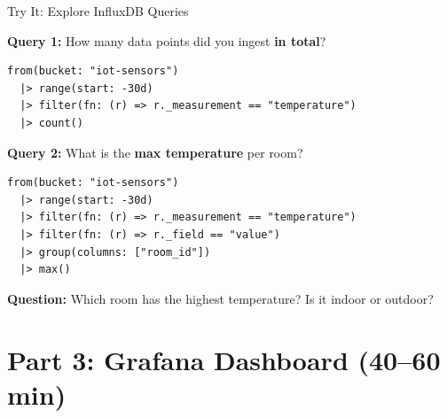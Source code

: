 \documentclass[aspectratio=169,11pt]{beamer}
\begin{document}
\begin{frame}[fragile]{ Try It: Explore InfluxDB Queries}

    \vspace{0.15cm}
    \textbf{Query 1:} How many data points did you ingest \textbf{in total}?
\begin{lstlisting}
from(bucket: "iot-sensors")
  |> range(start: -30d)
  |> filter(fn: (r) => r._measurement == "temperature")
  |> count()
\end{lstlisting}

    \vspace{0.1cm}
    \textbf{Query 2:} What is the \textbf{max temperature} per room?
\begin{lstlisting}
from(bucket: "iot-sensors")
  |> range(start: -30d)
  |> filter(fn: (r) => r._measurement == "temperature")
  |> filter(fn: (r) => r._field == "value")
  |> group(columns: ["room_id"])
  |> max()
\end{lstlisting}

    \vspace{0.1cm}
    \textbf{Question:} Which room has the highest temperature? Is it indoor or outdoor?
\end{frame}

\section{Part 3: Grafana Dashboard (40--60 min)}
\end{document}
